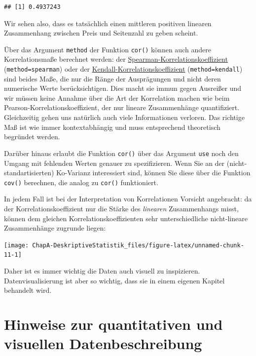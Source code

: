 \documentclass[]{book}
\begin{document}
\begin{verbatim}
## [1] 0.4937243
\end{verbatim}

Wir sehen also, dass es tatsächlich einen mittleren positiven linearen
Zusammenhang zwischen Preis und Seitenzahl zu geben scheint.

Über das Argument \texttt{method} der Funktion \texttt{cor()} können
auch andere Korrelationsmaße berechnet werden: der
\href{https://de.wikipedia.org/wiki/Rangkorrelationskoeffizient\#Spearman'scher_Rangkorrelationskoeffizient}{Spearman-Korrelationskoeffizient}
(\texttt{method=\textquotesingle{}spearman\textquotesingle{}}) oder der
\href{https://de.wikipedia.org/wiki/Rangkorrelationskoeffizient\#Kendall'sches_Tau}{Kendall-Korrelationskoeffizient}
(\texttt{method=\textquotesingle{}kendall\textquotesingle{}}) sind
beides Maße, die nur die Ränge der Ausprägungen und nicht deren
numerische Werte berücksichtigen. Dies macht sie immun gegen Ausreißer
und wir müssen keine Annahme über die Art der Korrelation machen wie
beim Pearson-Korrelationskoeffizient, der nur lineare Zusammenhänge
quantifiziert. Gleichzeitig gehen uns natürlich auch viele Informationen
verloren. Das richtige Maß ist wie immer kontextabhängig und muss
entsprechend theoretisch begründet werden.

Darüber hinaus erlaubt die Funktion \texttt{cor()} über das Argument
\texttt{use} noch den Umgang mit fehlenden Werten genauer zu
spezifizieren. Wenn Sie an der (nicht-standartisierten) Ko-Varianz
interessiert sind, können Sie diese über die Funktion \texttt{cov()}
berechnen, die analog zu \texttt{cor()} funktioniert.

In jedem Fall ist bei der Interpretation von Korrelationen Vorsicht
angebracht: da der Korrelationskoeffizient nur die Stärke des
\emph{linearen} Zusammenhangs misst, können dem gleichen
Korrelationskoeffizienten sehr unterschiedliche nicht-lineare
Zusammenhänge zugrunde liegen:

\begin{center}\texttt{[image: ChapA-DeskriptiveStatistik\_files/figure-latex/unnamed-chunk-11-1]} \end{center}

Daher ist es immer wichtig die Daten auch visuell zu inspizieren.
Datenvisualisierung ist aber so wichtig, dass sie in einem eigenen
Kapitel behandelt wird.

\section{Hinweise zur quantitativen und visuellen
Datenbeschreibung}\label{hinweise-zur-quantitativen-und-visuellen-datenbeschreibung}
\end{document}
